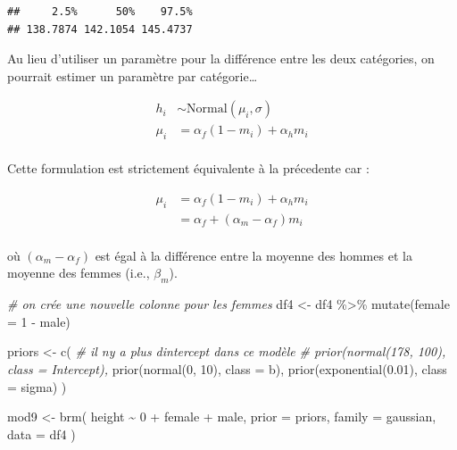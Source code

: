\documentclass[
  a4paper,11pt,twoside,onecolumn,openright,final,oldfontcommands]{memoir}
\newenvironment{Shaded}{\begin{snugshade}}{\end{snugshade}}
\newcommand{\AttributeTok}[1]{\textcolor[rgb]{0.77,0.63,0.00}{#1}}
\newcommand{\CommentTok}[1]{\textcolor[rgb]{0.56,0.35,0.01}{\textit{#1}}}
\newcommand{\DecValTok}[1]{\textcolor[rgb]{0.00,0.00,0.81}{#1}}
\newcommand{\FloatTok}[1]{\textcolor[rgb]{0.00,0.00,0.81}{#1}}
\newcommand{\FunctionTok}[1]{\textcolor[rgb]{0.00,0.00,0.00}{#1}}
\newcommand{\NormalTok}[1]{#1}
\newcommand{\OtherTok}[1]{\textcolor[rgb]{0.56,0.35,0.01}{#1}}
\newcommand{\SpecialCharTok}[1]{\textcolor[rgb]{0.00,0.00,0.00}{#1}}
\theoremstyle{definition}
\theoremstyle{definition}
\theoremstyle{definition}
\theoremstyle{definition}
\theoremstyle{remark}
\begin{document}
\begin{verbatim}
##     2.5%      50%    97.5% 
## 138.7874 142.1054 145.4737
\end{verbatim}

Au lieu d'utiliser un paramètre pour la différence entre les deux catégories, on pourrait estimer un paramètre par catégorie\ldots{}

\[
\begin{aligned}
h_{i} &\sim \mathrm{Normal}(\mu_{i}, \sigma) \\
\mu_{i} &= \alpha_{f}(1 - m_{i}) + \alpha_{h} m_{i} \\
\end{aligned}
\]

Cette formulation est strictement équivalente à la précedente car :

\[
\begin{aligned}
\mu_{i} &= \alpha_{f}(1 - m_{i}) + \alpha_{h} m_{i} \\
&= \alpha_{f} + (\alpha_{m} - \alpha_{f}) m_{i} \\
\end{aligned}
\]

où \((\alpha_{m} - \alpha_{f})\) est égal à la différence entre la moyenne des hommes et la moyenne des femmes (i.e., \(\beta_{m}\)).

\begin{Shaded}
\begin{Highlighting}[]
\CommentTok{\# on crée une nouvelle colonne pour les femmes}
\NormalTok{df4 }\OtherTok{\textless{}{-}}\NormalTok{ df4 }\SpecialCharTok{\%\textgreater{}\%} \FunctionTok{mutate}\NormalTok{(}\AttributeTok{female =} \DecValTok{1} \SpecialCharTok{{-}}\NormalTok{ male)}

\NormalTok{priors }\OtherTok{\textless{}{-}} \FunctionTok{c}\NormalTok{(}
  \CommentTok{\# il n\textquotesingle{}y a plus d\textquotesingle{}intercept dans ce modèle}
  \CommentTok{\# prior(normal(178, 100), class = Intercept),}
  \FunctionTok{prior}\NormalTok{(}\FunctionTok{normal}\NormalTok{(}\DecValTok{0}\NormalTok{, }\DecValTok{10}\NormalTok{), }\AttributeTok{class =}\NormalTok{ b),}
  \FunctionTok{prior}\NormalTok{(}\FunctionTok{exponential}\NormalTok{(}\FloatTok{0.01}\NormalTok{), }\AttributeTok{class =}\NormalTok{ sigma)}
\NormalTok{  )}

\NormalTok{mod9 }\OtherTok{\textless{}{-}} \FunctionTok{brm}\NormalTok{(}
\NormalTok{  height }\SpecialCharTok{\textasciitilde{}} \DecValTok{0} \SpecialCharTok{+}\NormalTok{ female }\SpecialCharTok{+}\NormalTok{ male,}
  \AttributeTok{prior =}\NormalTok{ priors,}
  \AttributeTok{family =}\NormalTok{ gaussian,}
  \AttributeTok{data =}\NormalTok{ df4}
\NormalTok{  )}
\end{Highlighting}
\end{Shaded}
\end{document}
